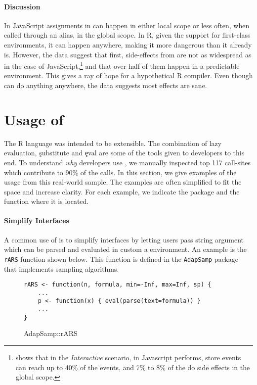 \documentclass[screen,acmsmall]{acmart}%
\newcommand{\code}[1]{\lstinline |#1|\xspace}
\begin{document}
\paragraph{Discussion} In JavaScript assignments in \eval can happen in either
local scope or less often, when called through an alias, in the global scope.
In R, given the support for first-class environments, it can happen anywhere,
making it \eval more dangerous than it already is. However, the data suggest
that first, side-effects from \eval are not as widespread as in the case of
JavaScript,\footnote{\citep{ecoop11} shows that in the \emph{Interactive}
  scenario, \eval in Javascript performs, store events can reach up to 40\% of
the events, and 7\% to 8\% of the \eval do side effects in the global scope. }
and that over half of them happen in a predictable environment. This gives a
ray of hope for a hypothetical R compiler. Even though \eval can do anything
anywhere, the data suggests most effects are sane.

\section{Usage of \eval}

The R language was intended to be extensible. The combination of lazy
evaluation, \c{substitute} and \c{eval} are some of the tools given to
developers to this end. To understand \emph{why} developers use \eval, we
manually inspected top 117 \eval call-sites which contribute to 90\% of the
\eval calls. In this section, we give examples of the \eval usage from this
real-world sample. The examples are often simplified to fit the space and
increase clarity. For each example, we indicate the package and the function
where it is located.

\paragraph{Simplify Interfaces} A common use of \eval is to simplify interfaces by
letting users pass string argument which can be parsed and evaluated in custom a
environment. An example is the \code{rARS} function shown below. This function
is defined in the \code{AdapSamp} package that implements sampling algorithms.

\begin{figure}[h]
\begin{lstlisting}
rARS <- function(n, formula, min=-Inf, max=Inf, sp) {
    ...
    p <- function(x) { eval(parse(text=formula)) }
    ...
}
\end{lstlisting}
  \caption{AdapSamp::rARS}
\end{figure}
\end{document}
